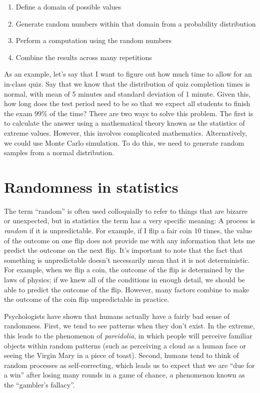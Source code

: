 \documentclass[12pt,]{book}
\providecommand{\tightlist}{%
  \setlength{\itemsep}{0pt}\setlength{\parskip}{0pt}}
\theoremstyle{definition}
\theoremstyle{definition}
\theoremstyle{definition}
\theoremstyle{remark}
\begin{document}
\begin{enumerate}
\def\labelenumi{\arabic{enumi}.}
\tightlist
\item
  Define a domain of possible values
\item
  Generate random numbers within that domain from a probability distribution
\item
  Perform a computation using the random numbers
\item
  Combine the results across many repetitions
\end{enumerate}

As an example, let's say that I want to figure out how much time to allow for an in-class quiz. Say that we know that the distribution of quiz completion times is normal, with mean of 5 minutes and standard deviation of 1 minute. Given this, how long does the test period need to be so that we expect all students to finish the exam 99\% of the time? There are two ways to solve this problem. The first is to calculate the answer using a mathematical theory known as the statistics of extreme values. However, this involves complicated mathematics. Alternatively, we could use Monte Carlo simulation. To do this, we need to generate random samples from a normal distribution.

\hypertarget{randomness-in-statistics}{%
\section{Randomness in statistics}\label{randomness-in-statistics}}

The term ``random'' is often used colloquially to refer to things that are bizarre or unexpected, but in statistics the term has a very specific meaning: A process is \emph{random} if it is unpredictable. For example, if I flip a fair coin 10 times, the value of the outcome on one flip does not provide me with any information that lets me predict the outcome on the next flip. It's important to note that the fact that something is unpredictable doesn't necessarily mean that it is not deterministic. For example, when we flip a coin, the outcome of the flip is determined by the laws of physics; if we knew all of the conditions in enough detail, we should be able to predict the outcome of the flip. However, many factors combine to make the outcome of the coin flip unpredictable in practice.

Psychologists have shown that humans actually have a fairly bad sense of randomness. First, we tend to see patterns when they don't exist. In the extreme, this leads to the phenomenon of \emph{pareidolia}, in which people will perceive familiar objects within random patterns (such as perceiving a cloud as a human face or seeing the Virgin Mary in a piece of toast). Second, humans tend to think of random processes as self-correcting, which leads us to expect that we are ``due for a win'' after losing many rounds in a game of chance, a phenomenon known as the ``gambler's fallacy''.
\end{document}
